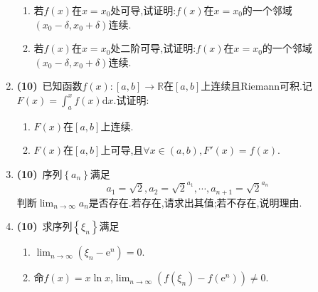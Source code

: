 \documentclass{ctexart}
\newcommand{\e}{\mathrm{e}}
\newcommand{\di}{\mathrm{d}}
\newcommand{\R}{\mathbb{R}}
\newcommand{\dx}{\di x}
\begin{document}
\begin{enumerate}[leftmargin=*,label=\textbf{\arabic*.}]
        \begin{enumerate}[label=\textbf{(\arabic*)}]
            \item 若$f(x)$在$x=x_0$处可导,试证明:$f(x)$在$x=x_0$的一个邻域$(x_0-\delta,x_0+\delta)$连续.
            \item 若$f(x)$在$x=x_0$处二阶可导,试证明:$f(x)$在$x=x_0$的一个邻域$(x_0-\delta,x_0+\delta)$连续.
        \end{enumerate}
    \item \textbf{(10)}\ 已知函数$f(x):[a,b]\to\R$在$[a,b]$上连续且Riemann可积.记$\displaystyle F(x)=\int_a^x{f(x)\dx}$.试证明:
        \begin{enumerate}[label=\textbf{(\arabic*)}]
            \item $F(x)$在$[a,b]$上连续.
            \item $F(x)$在$[a,b]$上可导,且$\forall x\in(a,b),F'(x)=f(x)$.
        \end{enumerate}
    \item \textbf{(10)}\ 序列$\left\{a_n\right\}$满足
        $$a_1=\sqrt{2},a_2=\sqrt{2}^{a_1},\cdots,a_{n+1}=\sqrt{2}^{a_n}$$
        判断$\displaystyle\lim_{n\to\infty}a_n$是否存在.若存在,请求出其值;若不存在,说明理由.
    \item \textbf{(10)}\ 求序列$\left\{\xi_n\right\}$满足
        \begin{enumerate}[label=\textbf{(\alph*)}]
            \item $\displaystyle\lim_{n\to\infty}\left(\xi_n-\e^n\right)=0$.
            \item 命$f(x)=x\ln x$,$\displaystyle\lim_{n\to\infty}{\left(f(\xi_n)-f(\e^n)\right)}\neq0$.
        \end{enumerate}
\end{enumerate}
\end{document}
